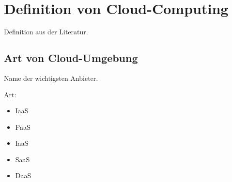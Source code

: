 \section{Definition von Cloud-Computing}

Definition aus der Literatur.

\subsection{Art von Cloud-Umgebung}

Name der wichtigsten Anbieter.

Art:
\begin{itemize}
   \item IaaS
   \item PaaS
   \item IaaS
   \item SaaS
   \item DaaS
\end{itemize}



